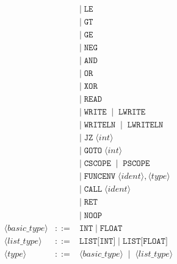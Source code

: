 \documentclass{article}
\begin{document}
\[\begin{array}{rcl}
&& \mid\; \texttt{LE}
\\[2pt]

&& \mid\; \texttt{GT}
\\[2pt]

&& \mid\; \texttt{GE}
\\[2pt]

&& \mid\; \texttt{NEG}
\\[2pt]

&& \mid\; \texttt{AND}
\\[2pt]

&& \mid\; \texttt{OR}
\\[2pt]

&& \mid\; \texttt{XOR}
\\[2pt]

&& \mid\; \texttt{READ}
\\[2pt]

&& \mid\; \texttt{WRITE} \;\mid\; \texttt{LWRITE}
\\[2pt]

&& \mid\; \texttt{WRITELN} \;\mid\; \texttt{LWRITELN}
\\[2pt]

&& \mid\; \texttt{JZ} \; \langle int \rangle
\\[2pt]

&& \mid\; \texttt{GOTO} \; \langle int \rangle
\\[2pt]

&& \mid\; \texttt{CSCOPE} \;\mid\; \texttt{PSCOPE}
\\[2pt]

&& \mid\; \texttt{FUNCENV} \; \langle ident \rangle, \langle type \rangle
\\[2pt]

&& \mid\; \texttt{CALL} \; \langle ident \rangle
\\[2pt]

&& \mid\; \texttt{RET}
\\[2pt]

&& \mid\; \texttt{NOOP}
\\[15pt]

\langle \mathit{basic\_type} \rangle &::=& \texttt{INT} \;\mid\; \texttt{FLOAT}\\[6pt]

\langle \mathit{list\_type} \rangle &::=& \texttt{LIST[INT]} \;\mid\; \texttt{LIST[FLOAT]}  \\[6pt]

\langle \mathit{type} \rangle &::=& \langle \mathit{basic\_type} \rangle \;\mid\; \langle \mathit{list\_type} \rangle \\[6pt]


\end{array}\]
\end{document}
